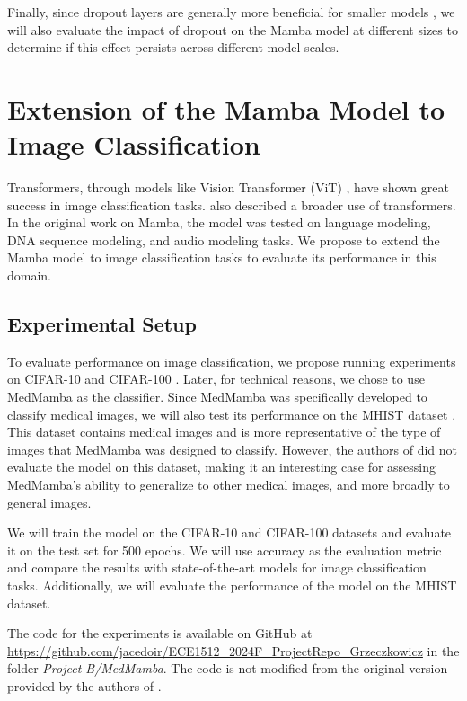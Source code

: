 \documentclass[onecolumn]{IEEEtran}
\begin{document}
Finally, since dropout layers are generally more beneficial for smaller models \cite{escolano2024residual}, we will also evaluate the impact of dropout on the Mamba model at different sizes to determine if this effect persists across different model scales.

\section{Extension of the Mamba Model to Image Classification}
Transformers, through models like Vision Transformer (ViT) \cite{dosovitskiy2020image}, have shown great success in image classification tasks. \cite{khan2022transformers} also described a broader use of transformers. In the original work on Mamba, the model was tested on language modeling, DNA sequence modeling, and audio modeling tasks. We propose to extend the Mamba model to image classification tasks to evaluate its performance in this domain.

\subsection{Experimental Setup}
To evaluate performance on image classification, we propose running experiments on CIFAR-10 and CIFAR-100 \cite{alex2009learning}. Later, for technical reasons, we chose to use MedMamba \cite{yue2024medmamba} as the classifier. Since MedMamba was specifically developed to classify medical images, we will also test its performance on the MHIST dataset \cite{wei2021petri}. This dataset contains medical images and is more representative of the type of images that MedMamba was designed to classify. However, the authors of \cite{yue2024medmamba} did not evaluate the model on this dataset, making it an interesting case for assessing MedMamba's ability to generalize to other medical images, and more broadly to general images.

We will train the model on the CIFAR-10 and CIFAR-100 datasets and evaluate it on the test set for 500 epochs. We will use accuracy as the evaluation metric and compare the results with state-of-the-art models for image classification tasks. Additionally, we will evaluate the performance of the model on the MHIST dataset.

The code for the experiments is available on GitHub at \url{https://github.com/jacedoir/ECE1512_2024F_ProjectRepo_Grzeczkowicz} in the folder \textit{Project B/MedMamba}. The code is not modified from the original version provided by the authors of \cite{yue2024medmamba}.
\end{document}
